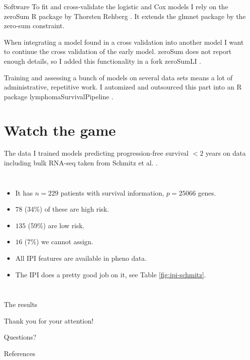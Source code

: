\documentclass[10pt, aspectratio=169]{beamer}
\begin{document}
\begin{frame}{Software}
  To fit and cross-validate the logistic and Cox models I rely on the \alert{zeroSum R package} 
  by Thorsten Rehberg \autocite{zerosumR}. It extends the glmnet package by the zero-sum constraint.

  When integrating a model found in a cross validation into another model I want to continue the cross 
  validation of the early model. zeroSum does not report enough details, so I added this functionality in 
  a \alert{fork zeroSumLI} \autocite{zerosumliR}.

  Training and assessing a bunch of models on several data sets means a lot of administrative, repetitive 
  work. I automized and outsourced this part into an \alert{R package lymphomaSurvivalPipeline} \autocite{lspR}.
\end{frame}

\section{Watch the game}

\begin{frame}{The data}
  I trained models predicting progression-free survival $< 2$ years on data including bulk RNA-seq 
  taken from Schmitz et al. \autocite{schmitz18}. 
  \begin{columns}
      \begin{itemize}
        \item It has $n = \num{229}$ patients with survival information, $p = \num{25066}$ genes.
        \item $\num{78}$ (34\%) of these are high risk.
        \item $\num{135}$ (59\%) are low risk. 
        \item $\num{16}$ (7\%) we cannot assign.
        \item All IPI features are available in pheno data.
        \item The IPI does a pretty good job on it, see Table \ref{fig:ipi-schmitz}.
      \end{itemize}
      
    \end{columns}
\end{frame}

\begin{frame}{The results}
  \small
  
\end{frame}

\begin{frame}[standout]
  Thank you for your attention! \par Questions?
\end{frame}

\appendix

\begin{frame}[allowframebreaks]{References}
  \printbibliography
\end{frame}
\end{document}
